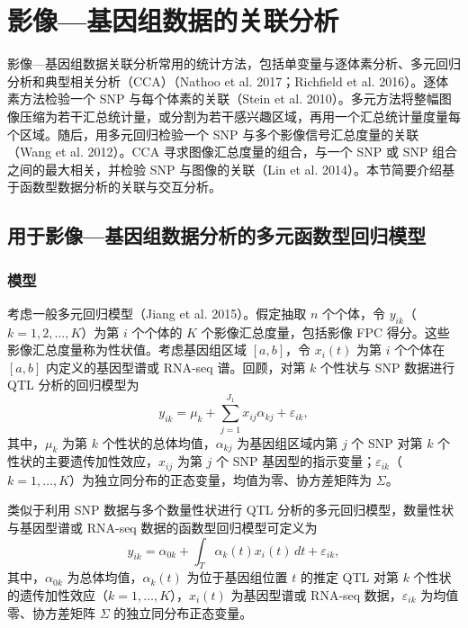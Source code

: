 \section{影像—基因组数据的关联分析}

影像—基因组数据关联分析常用的统计方法，包括单变量与逐体素分析、多元回归分析和典型相关分析（CCA）（Nathoo et al. 2017；Richfield et al. 2016）。逐体素方法检验一个 SNP 与每个体素的关联（Stein et al. 2010）。多元方法将整幅图像压缩为若干汇总统计量，或分割为若干感兴趣区域，再用一个汇总统计量度量每个区域。随后，用多元回归检验一个 SNP 与多个影像信号汇总度量的关联（Wang et al. 2012）。CCA 寻求图像汇总度量的组合，与一个 SNP 或 SNP 组合之间的最大相关，并检验 SNP 与图像的关联（Lin et al. 2014）。本节简要介绍基于函数型数据分析的关联与交互分析。

\subsection{用于影像—基因组数据分析的多元函数型回归模型}
\subsubsection{模型}

考虑一般多元回归模型（Jiang et al. 2015）。假定抽取 $n$ 个个体，令 $y_{ik}$（$k=1,2,\ldots,K$）为第 $i$ 个个体的 $K$ 个影像汇总度量，包括影像 FPC 得分。这些影像汇总度量称为性状值。考虑基因组区域 $[a,b]$，令 $x_i(t)$ 为第 $i$ 个个体在 $[a,b]$ 内定义的基因型谱或 RNA-seq 谱。回顾，对第 $k$ 个性状与 SNP 数据进行 QTL 分析的回归模型为
\begin{equation}
y_{ik}=\mu_k+\sum_{j=1}^{J_1}x_{ij}\alpha_{kj}+\varepsilon_{ik},
\tag{6.168}
\end{equation}
其中，$\mu_k$ 为第 $k$ 个性状的总体均值，$\alpha_{kj}$ 为基因组区域内第 $j$ 个 SNP 对第 $k$ 个性状的主要遗传加性效应，$x_{ij}$ 为第 $j$ 个 SNP 基因型的指示变量；$\varepsilon_{ik}$（$k=1,\ldots,K$）为独立同分布的正态变量，均值为零、协方差矩阵为 $\Sigma$。

类似于利用 SNP 数据与多个数量性状进行 QTL 分析的多元回归模型，数量性状与基因型谱或 RNA-seq 数据的函数型回归模型可定义为
\begin{equation}
y_{ik}=\alpha_{0k}+\int_T\alpha_k(t)x_i(t)\,dt+\varepsilon_{ik},
\tag{6.169}
\end{equation}
其中，$\alpha_{0k}$ 为总体均值，$\alpha_k(t)$ 为位于基因组位置 $t$ 的推定 QTL 对第 $k$ 个性状的遗传加性效应（$k=1,\ldots,K$），$x_i(t)$ 为基因型谱或 RNA-seq 数据，$\varepsilon_{ik}$ 为均值零、协方差矩阵 $\Sigma$ 的独立同分布正态变量。

